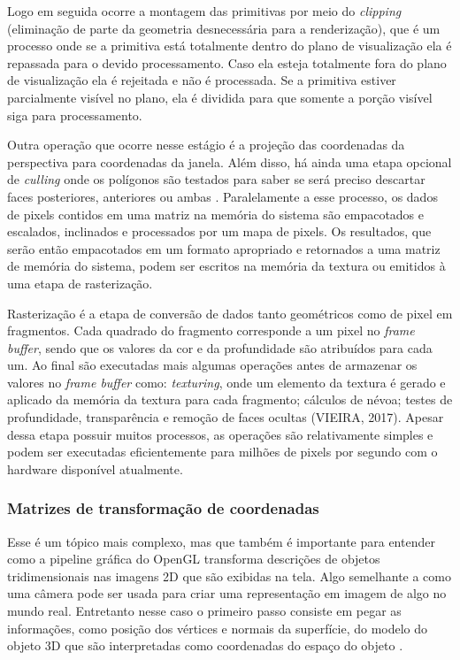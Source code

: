 Logo em seguida ocorre a montagem das primitivas por meio do \textit{clipping} (eliminação de parte da geometria desnecessária para a renderização), que é um processo onde se a primitiva está totalmente dentro do plano de visualização ela é repassada para o devido processamento. Caso ela esteja totalmente fora do plano de visualização ela é rejeitada e não é processada. Se a primitiva estiver parcialmente visível no plano, ela é dividida para que somente a porção visível siga para processamento.

Outra operação que ocorre nesse estágio é a projeção das coordenadas da perspectiva para coordenadas da janela. Além disso, há ainda uma etapa opcional de \textit{culling} onde os polígonos são testados para saber se será preciso descartar faces posteriores, anteriores ou ambas \cite{GLSLBook}. Paralelamente a esse processo, os dados de pixels contidos em uma matriz na memória do sistema são empacotados e escalados, inclinados e processados por um mapa de pixels. Os resultados, que serão então empacotados em um formato apropriado e retornados a uma matriz de memória do sistema, podem ser escritos na memória da textura ou emitidos à uma etapa de rasterização.

Rasterização é a etapa de conversão de dados tanto geométricos como de pixel em fragmentos. Cada quadrado do fragmento corresponde a um pixel no \textit{frame buffer}, sendo que os valores da cor e da profundidade são atribuídos para cada um. Ao final são executadas mais algumas operações antes de armazenar os valores no \textit{frame buffer} como: \textit{texturing}, onde um elemento da textura é gerado e aplicado da memória da textura para cada fragmento; cálculos de névoa; testes de profundidade, transparência e remoção de faces ocultas (VIEIRA, 2017). Apesar dessa etapa possuir muitos processos, as operações são relativamente simples e podem ser executadas eficientemente para milhões de pixels por segundo com o hardware disponível atualmente.

\subsubsection{Matrizes de transformação de coordenadas}
\label{sec:matrizes-transformacao-coordenadas}

Esse é um tópico mais complexo, mas que também é importante para entender como a pipeline gráfica do OpenGL transforma descrições de objetos tridimensionais nas imagens 2D que são exibidas na tela. Algo semelhante a como uma câmera pode ser usada para criar uma representação em imagem de algo no mundo real. Entretanto nesse caso o primeiro passo consiste em pegar as informações, como posição dos vértices e normais da superfície, do modelo do objeto 3D que são interpretadas como coordenadas do espaço do objeto \cite{GLSLBook}. 

